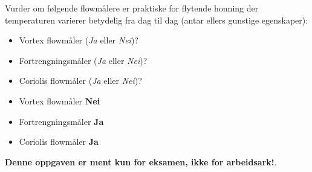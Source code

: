 

Vurder om følgende flowmålere er praktiske for flytende honning der temperaturen varierer betydelig fra dag til dag (antar ellers gunstige egenskaper):

\begin{itemize}
\item{} Vortex flowmåler ({\it Ja} eller {\it Nei})?
\vskip 10pt
\item{} Fortrengningsmåler ({\it Ja} eller {\it Nei})?
\vskip 10pt
\item{} Coriolis flowmåler ({\it Ja} eller {\it Nei})?
\end{itemize}







\begin{itemize}
\item{} Vortex flowmåler {\bf Nei}
\item{} Fortrengningsmåler {\bf Ja}
\item{} Coriolis flowmåler {\bf Ja}
\end{itemize}







{\bf Denne oppgaven er ment kun for eksamen, ikke for arbeidsark!}.


